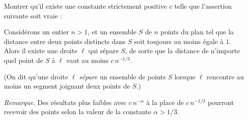 Montrer qu'il existe une constante strictement positive $c$ telle que
l'assertion suivante soit vraie :

Considérons un entier $n > 1$, et un ensemble $S$ de $n$ points du plan tel
que la distance entre deux points distincts dans $S$ soit toujours au moins
égale à $1$. Alors il existe une droite $\ell$ qui sépare $S$, de sorte que la
distance de n'importe quel point de $S$ à $\ell$ vaut au moins $c\, n^{-1/3}$.

(On dit qu'une droite $\ell$ \emph{sépare} un ensemble de points $S$ lorsque
$\ell$ rencontre au moins un segment joignant deux points de $S$.)

\medskip
\emph{Remarque.} Des résultats plus faibles avec $c\, n^{-\alpha}$ à la place
de $c\, n^{-1/3}$ pourront recevoir des points selon la valeur de la constante
$\alpha > 1/3$.
